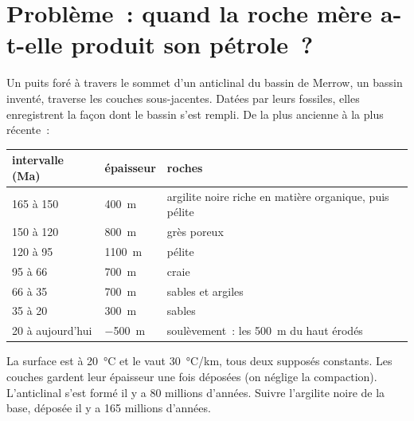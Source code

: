 \section{Problème~: quand la roche mère a-t-elle produit son pétrole~?}

\begin{problem}
\label{pb:g11:fossil-fuel-geology:1}
Un puits foré à travers le sommet d'un anticlinal du bassin de Merrow, un
bassin inventé, traverse les couches sous-jacentes. Datées par leurs
fossiles, elles enregistrent la façon dont le bassin s'est rempli. De la
plus ancienne à la plus récente~:
\begin{center}
\small
\begin{tabular}{|l|l|l|}
\hline
\textbf{intervalle (Ma)} & \textbf{épaisseur} & \textbf{roches} \\
\hline
165 à 150 & \qty{400}{m} & argilite noire riche en matière organique, puis pélite \\
150 à 120 & \qty{800}{m} & grès poreux \\
120 à 95 & \qty{1100}{m} & pélite \\
95 à 66 & \qty{700}{m} & craie \\
66 à 35 & \qty{700}{m} & sables et argiles \\
35 à 20 & \qty{300}{m} & sables \\
20 à aujourd'hui & \qty{-500}{m} & soulèvement~: les \qty{500}{m} du haut érodés \\
\hline
\end{tabular}
\end{center}
La surface est à \qty{20}{\degreeCelsius} et le  vaut
\qty{30}{\degreeCelsius/km}, tous deux supposés constants. Les couches
gardent leur épaisseur une fois déposées (on néglige la compaction).
L'anticlinal s'est formé il y a 80 millions d'années. Suivre l'argilite
noire de la base, déposée il y a 165 millions d'années.


\end{problem}
